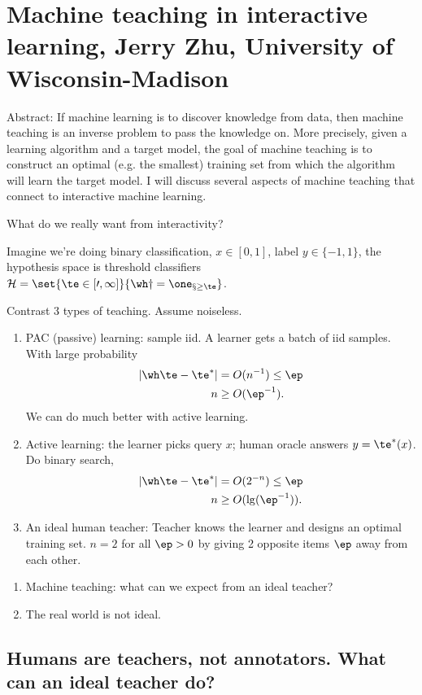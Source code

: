 \section{Machine teaching in interactive learning, Jerry Zhu, University of Wisconsin-Madison}

Abstract: If machine learning is to discover knowledge from data, then machine teaching is an inverse problem to pass the knowledge on. More precisely, given a learning algorithm and a target model, the goal of machine teaching is to construct an optimal (e.g. the smallest) training set from which the algorithm will learn the target model. I will discuss several aspects of machine teaching that connect to interactive machine learning.

What do we really want from interactivity? 

Imagine we're doing binary classification, $x\in [0,1]$, label $y\in \{-1,1\}$, the hypothesis space is threshold classifiers $\cal H = \set{\te\in [0,1]}{\wh y = \one_{x\ge \te}}$.

Contrast 3 types of teaching. Assume noiseless.
\begin{enumerate}
\item
PAC (passive) learning: sample iid. A learner gets a batch of iid samples. With large probability
\begin{align}
|\wh \te - \te^*| &=O(n^{-1}) \le \ep\\
n&\ge O(\ep^{-1}).
\end{align}
We can do much better with active learning.
\item
Active learning: the learner picks query $x$; human oracle answers $y=\te^*(x)$. Do binary search,
\begin{align}
|\wh \te - \te^*| &=O(2^{-n}) \le \ep\\
n&\ge O(\lg(\ep^{-1})).
\end{align}
\item
An ideal human teacher: Teacher knows the learner and designs an optimal training set. $n=2$ for all $\ep>0$ by giving 2 opposite items $\ep$ away from each other.
\end{enumerate}
\begin{enumerate}
\item
Machine teaching: what can we expect from an ideal teacher?
\item
The real world is not ideal.
\end{enumerate}

\subsection{Humans are teachers, not annotators. What can an ideal teacher do?}


